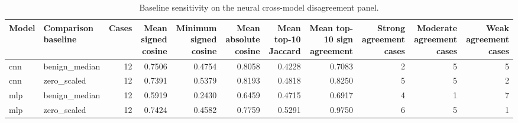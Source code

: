 \begin{table}
\caption{Baseline sensitivity on the neural cross-model disagreement panel.}
\label{tab:ig_baseline_sensitivity}
\begin{tabular}{llrrrrrrrrr}
\toprule
Model & Comparison baseline & Cases & Mean signed cosine & Minimum signed cosine & Mean absolute cosine & Mean top-10 Jaccard & Mean top-10 sign agreement & Strong agreement cases & Moderate agreement cases & Weak agreement cases \\
\midrule
cnn & benign\_median & 12 & 0.7506 & 0.4754 & 0.8058 & 0.4228 & 0.7083 & 2 & 5 & 5 \\
cnn & zero\_scaled & 12 & 0.7391 & 0.5379 & 0.8193 & 0.4818 & 0.8250 & 5 & 5 & 2 \\
mlp & benign\_median & 12 & 0.5919 & 0.2430 & 0.6459 & 0.4715 & 0.6917 & 4 & 1 & 7 \\
mlp & zero\_scaled & 12 & 0.7424 & 0.4582 & 0.7759 & 0.5291 & 0.9750 & 6 & 5 & 1 \\
\bottomrule
\end{tabular}
\end{table}
